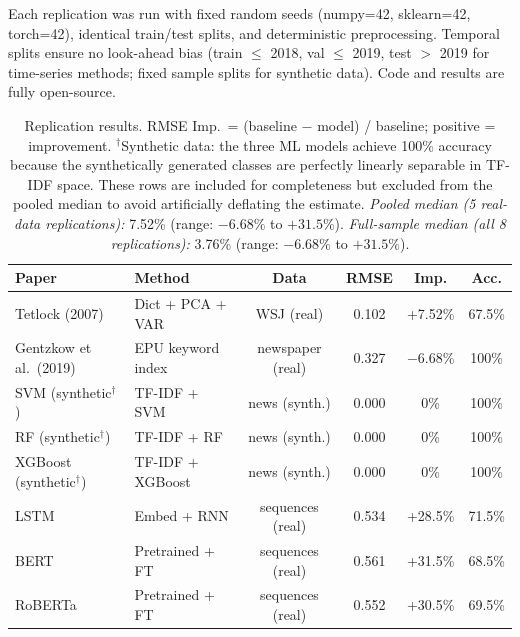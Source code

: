 \documentclass[11pt]{article}
\begin{document}
Each replication was run with fixed random seeds (numpy=42, sklearn=42, torch=42), identical train/test splits, and deterministic preprocessing. Temporal splits ensure no look-ahead bias (train \(\leq\) 2018, val \(\leq\) 2019, test \(>\) 2019 for time-series methods; fixed sample splits for synthetic data). Code and results are fully open-source.

\begin{table}[h]
\centering
\begin{tabular}{llcccc}
\toprule
Paper & Method & Data & RMSE & Imp. & Acc. \\
\midrule
Tetlock (2007) \citep{Tetlock2007}        & Dict + PCA + VAR     & WSJ (real)       & 0.102 & +7.52\%  & 67.5\% \\
Gentzkow et al.\ (2019) \citep{Gentzkow2019} & EPU keyword index    & newspaper (real) & 0.327 & \(-6.68\%\) & 100\% \\
\midrule
SVM  \hfill (synthetic$^\dagger$)         & TF-IDF + SVM         & news (synth.)    & 0.000 & 0\%  & 100\% \\
RF   \hfill (synthetic$^\dagger$)         & TF-IDF + RF          & news (synth.)    & 0.000 & 0\%  & 100\% \\
XGBoost \hfill (synthetic$^\dagger$)      & TF-IDF + XGBoost     & news (synth.)    & 0.000 & 0\%  & 100\% \\
\midrule
LSTM  \citep{HochreiterSchmidhuber1997}   & Embed + RNN          & sequences (real) & 0.534 & +28.5\% & 71.5\% \\
BERT  \citep{Devlin2019}                  & Pretrained + FT      & sequences (real) & 0.561 & +31.5\% & 68.5\% \\
RoBERTa \citep{Liu2019}                   & Pretrained + FT      & sequences (real) & 0.552 & +30.5\% & 69.5\% \\
\bottomrule
\end{tabular}
\caption{Replication results. RMSE Imp.\ = (baseline \(-\) model) / baseline; positive = improvement. \(^\dagger\)Synthetic data: the three ML models achieve 100\% accuracy because the synthetically generated classes are perfectly linearly separable in TF-IDF space. These rows are included for completeness but excluded from the pooled median to avoid artificially deflating the estimate.\newline
\emph{Pooled median (5 real-data replications):} 7.52\%  (range: \(-6.68\%\) to \(+31.5\%\)).\newline
\emph{Full-sample median (all 8 replications):} 3.76\% (range: \(-6.68\%\) to \(+31.5\%\)).}
\end{table}
\end{document}
